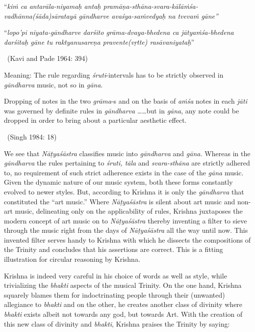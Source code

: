 \begin{myquote}
“\textit{kiṁ ca antarāla-niyamaḥ antaḥ pramāṇa-sthāna-svara-kālāṁśa-vadhānna\break (śāda)sāratayā gāndharve avaśya-saṁvedyaḥ  na tvevaṁ gāne”}
\end{myquote}

\begin{myquote}
“\textit{lopo’pi niyata-gāndharve darśito grāma-dvaya-bhedena ca jātyaṁśa-bhedena darśitaḥ  gāne tu raktyanusareṇa pravente(vṛtte) rasāvaniyataḥ}” 

~\hfill (Kavi and Pade 1964: 394)
\end{myquote}

\begin{myquote}
Meaning: The rule regarding \textit{śruti}-intervals has to be strictly observed in \textit{gāndharva} music, not so in \textit{gāna}.
\end{myquote}

\begin{myquote}
Dropping of notes in the two \textit{grāma}-s and on the basis of \textit{aṁśa} notes in each \textit{jāti} was governed by definite rules in \textit{gāndharva} ……but in \textit{gāna}, any note could be dropped in order to bring about a particular aesthetic effect. 

~\hfill (Singh 1984: 18)
\end{myquote}

We see that \textit{Nāṭyaśāstra} classifies music into \textit{gāndharva} and \textit{gāna.} Whereas in the \textit{gāndharva} the rules pertaining to \textit{śruti, tāla} and \textit{svara-sthāna} are strictly adhered to, no requirement of such strict adherence exists in the case of the \textit{gāna} music. Given the dynamic nature of our music system, both these forms constantly evolved to newer styles. But, according to Krishna it is only the \textit{gāndharva} that constituted the “art music.” Where \textit{Nāṭyaśāstra} is silent about art music and non-art music, delineating only on the applicability of rules, Krishna juxtaposes the modern concept of art music on to \textit{Nāṭyaśāstra} thereby inventing a filter to sieve through the music right from the days of \textit{Nāṭyaśāstra} all the way until now. This invented filter serves handy to Krishna with which he dissects the compositions of the Trinity and concludes that his assertions are correct. This is a fitting illustration for circular reasoning by Krishna.

Krishna is indeed very careful in his choice of words as well as style, while trivializing the \textit{bhakti} aspects of the musical Trinity. On the one hand, Krishna squarely blames them for indoctrinating people through their (unwanted) allegiance to \textit{bhakti} and on the other, he creates another class of divinity where \textit{bhakti} exists albeit not towards any god, but towards Art. With the creation of this new class of divinity and \textit{bhakti}, Krishna praises the Trinity by saying:

